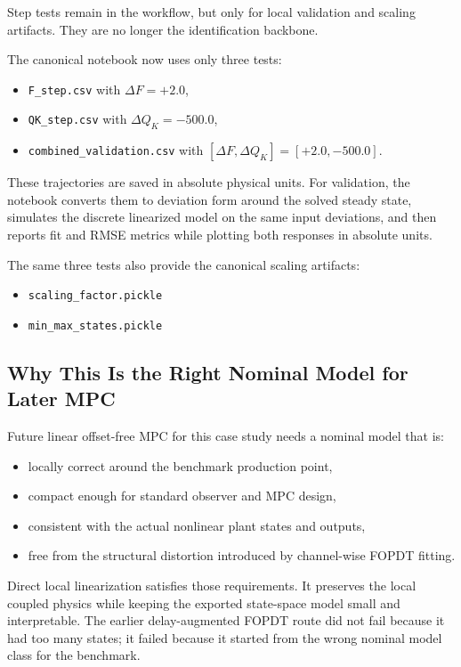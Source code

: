 Step tests remain in the workflow, but only for local validation and scaling artifacts. They are no longer the identification backbone.

The canonical notebook now uses only three tests:
\begin{itemize}
    \item \texttt{F\_step.csv} with \(\Delta F = +2.0\),
    \item \texttt{QK\_step.csv} with \(\Delta Q_K = -500.0\),
    \item \texttt{combined\_validation.csv} with \([\Delta F, \Delta Q_K] = [+2.0, -500.0]\).
\end{itemize}

These trajectories are saved in absolute physical units. For validation, the notebook converts them to deviation form around the solved steady state, simulates the discrete linearized model on the same input deviations, and then reports fit and RMSE metrics while plotting both responses in absolute units.

The same three tests also provide the canonical scaling artifacts:
\begin{itemize}
    \item \texttt{scaling\_factor.pickle}
    \item \texttt{min\_max\_states.pickle}
\end{itemize}

\subsection{Why This Is the Right Nominal Model for Later MPC}

Future linear offset-free MPC for this case study needs a nominal model that is:
\begin{itemize}
    \item locally correct around the benchmark production point,
    \item compact enough for standard observer and MPC design,
    \item consistent with the actual nonlinear plant states and outputs,
    \item free from the structural distortion introduced by channel-wise FOPDT fitting.
\end{itemize}

Direct local linearization satisfies those requirements. It preserves the local coupled physics while keeping the exported state-space model small and interpretable. The earlier delay-augmented FOPDT route did not fail because it had too many states; it failed because it started from the wrong nominal model class for the benchmark.

